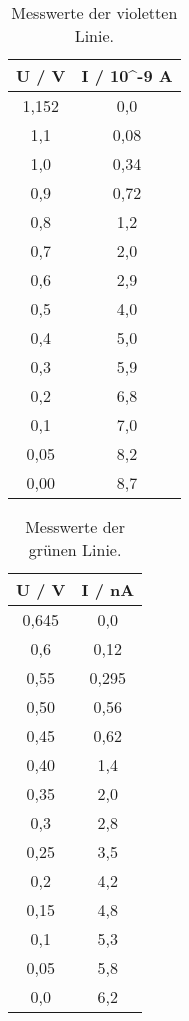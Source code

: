\begin{table} 
  \centering
  \caption{Messwerte der violetten Linie.}
  \label{tab:spek2}
  \begin{tabular}{c c}
    \toprule
    U / V & I / 10\textasciicircum -9 A \\
    \midrule
    1,152 &         0,0 \\
      1,1 &        0,08 \\
      1,0 &        0,34 \\
      0,9 &        0,72 \\
      0,8 &         1,2 \\
      0,7 &         2,0 \\
      0,6 &         2,9 \\
      0,5 &         4,0 \\
      0,4 &         5,0 \\
      0,3 &         5,9 \\
      0,2 &         6,8 \\
      0,1 &         7,0 \\
     0,05 &         8,2 \\
     0,00 &         8,7 \\
    \bottomrule
    \end{tabular}
\end{table}

\begin{table}
  \centering
  \caption{Messwerte der grünen Linie.}
  \label{tab:spek3}
  \begin{tabular}{c c}
    \toprule
    U / V & I / nA \\
    \midrule
    0,645 &    0,0 \\
      0,6 &   0,12 \\
     0,55 &  0,295 \\
     0,50 &   0,56 \\
     0,45 &   0,62 \\
     0,40 &    1,4 \\
     0,35 &    2,0 \\
      0,3 &    2,8 \\
     0,25 &    3,5 \\
      0,2 &    4,2 \\
     0,15 &    4,8 \\
      0,1 &    5,3 \\
     0,05 &    5,8 \\
      0,0 &    6,2 \\
    \bottomrule
    \end{tabular}
\end{table}

